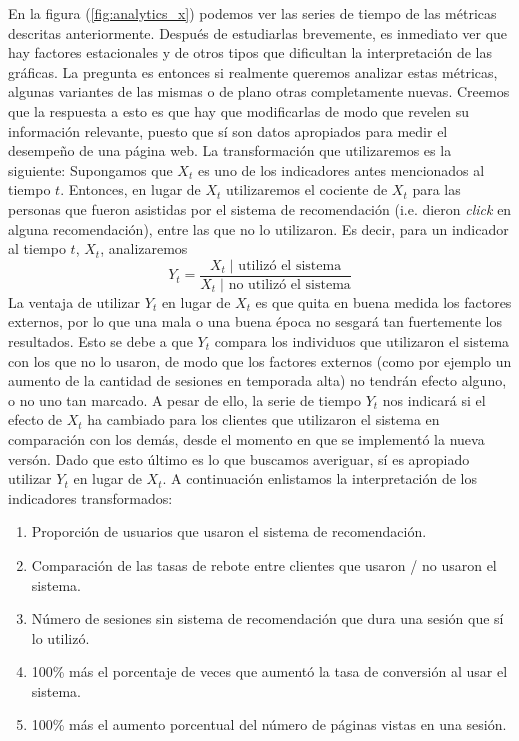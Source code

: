\documentclass[12pt]{report}
\begin{document}
En la figura (\ref{fig:analytics_x}) podemos ver las series de tiempo de las métricas descritas anteriormente. Después de estudiarlas brevemente, es inmediato ver que hay factores estacionales y de otros tipos que dificultan la interpretación de las gráficas. La pregunta es entonces si realmente queremos analizar estas métricas, algunas variantes de las mismas o de plano otras completamente nuevas. Creemos que la respuesta a esto es que hay que modificarlas de modo que revelen su información relevante, puesto que sí son datos apropiados para medir el desempeño de una página web. La transformación que utilizaremos es la siguiente: Supongamos que $X_t$ es uno de los indicadores antes mencionados al tiempo $t$. Entonces, en lugar de $X_t$ utilizaremos el cociente de $X_t$ para las personas que fueron asistidas por el sistema de recomendación (i.e. dieron \emph{click} en alguna recomendación), entre las que no lo utilizaron. Es decir, para un indicador al tiempo $t$, $X_t$, analizaremos
\[
Y_t = \frac{X_t \; | \text{ utilizó el sistema}}{X_t \; | \text{ no utilizó el sistema}}
\]
La ventaja de utilizar $Y_t$ en lugar de $X_t$ es que quita en buena medida los factores externos, por lo que una mala o una buena época no sesgará tan fuertemente los resultados. Esto se debe a que $Y_t$ compara los individuos que utilizaron el sistema con los que no lo usaron, de modo que los factores externos (como por ejemplo un aumento de la cantidad de sesiones en temporada alta) no tendrán efecto alguno, o no uno tan marcado. A pesar de ello, la serie de tiempo $Y_t$ nos indicará si el efecto de $X_t$ ha cambiado para los clientes que utilizaron el sistema en comparación con los demás, desde el momento en que se implementó la nueva versón. Dado que esto último es lo que buscamos averiguar, sí es apropiado utilizar $Y_t$ en lugar de $X_t$. A continuación enlistamos la interpretación de los indicadores transformados:
\begin{enumerate}
	\item Proporción de usuarios que usaron el sistema de recomendación.
	\item Comparación de las tasas de rebote entre clientes que usaron / no usaron el sistema.
	\item Número de sesiones sin sistema de recomendación que dura una sesión que sí lo utilizó.
	\item 100\% más el porcentaje de veces que aumentó la tasa de conversión al usar el sistema.
	\item 100\% más el aumento porcentual del número de páginas vistas en una sesión.
\end{enumerate}
\end{document}
